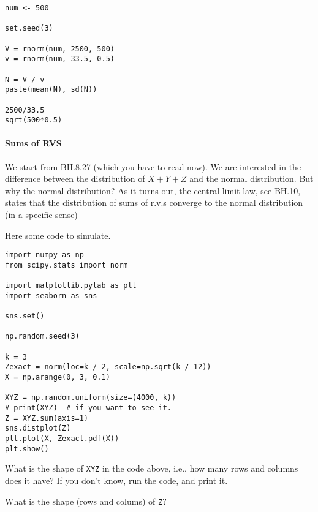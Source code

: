\documentclass[assignments]{subfiles}
\begin{document}
\begin{verbatim}
num <- 500

set.seed(3)

V = rnorm(num, 2500, 500)
v = rnorm(num, 33.5, 0.5)

N = V / v
paste(mean(N), sd(N))

2500/33.5
sqrt(500*0.5)
\end{verbatim}



\paragraph{Sums of RVS}

We start from BH.8.27 (which you have to read now).  We are interested in the difference between the distribution of $X+Y+Z$ and the normal distribution. But why the normal distribution? As it turns out, the central limit law, see BH.10, states that the distribution of sums of r.v.s converge to the normal distribution (in a specific sense)

Here some code to simulate.

\begin{verbatim}
import numpy as np
from scipy.stats import norm

import matplotlib.pylab as plt
import seaborn as sns

sns.set()

np.random.seed(3)

k = 3
Zexact = norm(loc=k / 2, scale=np.sqrt(k / 12))
X = np.arange(0, 3, 0.1)

XYZ = np.random.uniform(size=(4000, k))
# print(XYZ)  # if you want to see it.
Z = XYZ.sum(axis=1)
sns.distplot(Z)
plt.plot(X, Zexact.pdf(X))
plt.show()
\end{verbatim}


\begin{exercise}
What is the shape of \verb|XYZ| in the code above, i.e., how many rows and columns does it have? If you don't know, run the code, and print it.
\begin{solution}
\end{solution}
\end{exercise}

\begin{exercise}
What is the shape (rows and colums) of \verb|Z|?
\begin{solution}
\end{solution}
\end{exercise}
\end{document}
